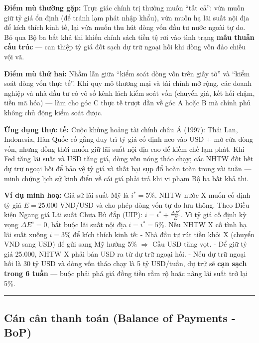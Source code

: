 \documentclass[
]{article}
\begin{document}
\textbf{Điểm mù thường gặp:} Trực giác chính trị thường muốn ``tất cả'':
vừa muốn giữ tỷ giá ổn định (để tránh lạm phát nhập khẩu), vừa muốn hạ
lãi suất nội địa để kích thích kinh tế, lại vừa muốn thu hút dòng vốn
đầu tư nước ngoài tự do. Bỏ qua Bộ ba bất khả thi khiến chính sách tiền
tệ rơi vào tình trạng \textbf{mâu thuẫn cấu trúc} --- can thiệp tỷ giá
đốt sạch dự trữ ngoại hối khi dòng vốn đảo chiều vội vã.

\textbf{Điểm mù thứ hai:} Nhầm lẫn giữa ``kiểm soát dòng vốn trên giấy
tờ'' và ``kiểm soát dòng vốn thực tế''. Khi quy mô thương mại và tài
chính mở rộng, các doanh nghiệp và nhà đầu tư có vô số kênh lách kiểm
soát vốn (chuyển giá, kết hối chậm, tiền mã hóa) --- làm cho góc C thực
tế trượt dần về góc A hoặc B mà chính phủ không chủ động kiểm soát được.

\textbf{Ứng dụng thực tế:} Cuộc khủng hoảng tài chính châu Á (1997):
Thái Lan, Indonesia, Hàn Quốc cố gắng duy trì tỷ giá cố định neo vào USD
+ mở cửa dòng vốn, nhưng đồng thời muốn giữ lãi suất nội địa cao để kiềm
chế lạm phát. Khi Fed tăng lãi suất và USD tăng giá, dòng vốn nóng tháo
chạy; các NHTW đốt hết dự trữ ngoại hối để bảo vệ tỷ giá và thất bại sụp
đổ hoàn toàn trong vài tuần --- minh chứng lịch sử kinh điển về cái giá
phải trả khi vi phạm Bộ ba bất khả thi.

\textbf{Ví dụ minh hoạ:} Giả sử lãi suất Mỹ là \(i^* = 5\%\). NHTW nước
X muốn cố định tỷ giá \(E = 25.000\text{ VND/USD}\) và cho phép dòng vốn
tự do lưu thông. Theo Điều kiện Ngang giá Lãi suất Chưa Bù đắp (UIP):
\(i = i^* + \frac{\Delta E^e}{E}\). Vì tỷ giá cố định kỳ vọng
\(\Delta E^e = 0\), bắt buộc lãi suất nội địa \(i = i^* = 5\%\). Nếu
NHTW X cố tình hạ lãi suất xuống \(i = 3\%\) để kích thích kinh tế: -
Nhà đầu tư rút tiền khỏi X (chuyển VND sang USD) để gửi sang Mỹ hưởng
5\% \(\Rightarrow\) Cầu USD tăng vọt. - Để giữ tỷ giá 25.000, NHTW X
phải bán USD ra từ dự trữ ngoại hối. - Nếu dự trữ ngoại hối là 30 tỷ USD
và dòng vốn tháo chạy là 5 tỷ USD/tuần, dự trữ sẽ \textbf{cạn sạch trong
6 tuần} --- buộc phải phá giá đồng tiền rầm rộ hoặc nâng lãi suất trở
lại 5\%.

\begin{center}\rule{0.5\linewidth}{0.5pt}\end{center}

\subsection{Cán cân thanh toán (Balance of Payments -
BoP)}\label{cuxe1n-cuxe2n-thanh-touxe1n-balance-of-payments---bop}
\end{document}
